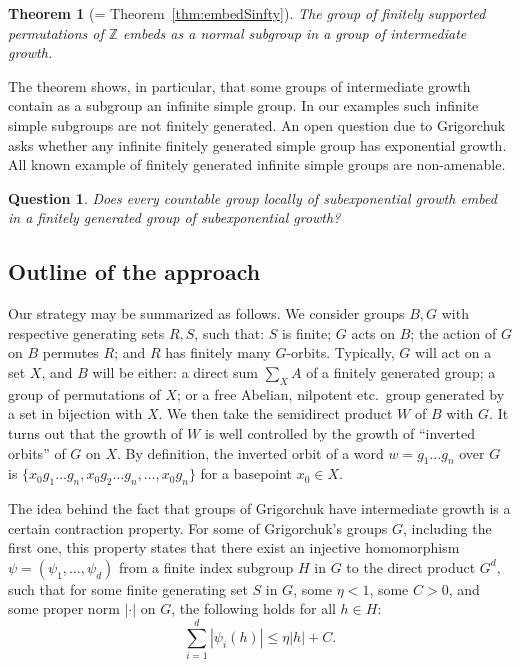 \documentclass{amsart}
\newcommand\Z{\mathbb{Z}}
\newtheorem{maintheorem}{Theorem}
\newtheorem*{mainquestion}{Question}
\theoremstyle{definition}
\begin{document}
\begin{maintheorem}[= Theorem~\ref{thm:embedSinfty}]\label{thm:C}
  The group of finitely supported permutations of $\Z$ embeds as a
  normal subgroup in a group of intermediate growth.
\end{maintheorem}

The theorem shows, in particular, that some groups of intermediate
growth contain as a subgroup an infinite simple group. In our examples
such infinite simple subgroups are not finitely generated. An open
question due to Grigorchuk asks whether any infinite finitely
generated simple group has exponential growth. All known example of
finitely generated infinite simple groups are non-amenable.

\begin{mainquestion}
  Does every countable group locally of subexponential growth embed in
  a finitely generated group of subexponential growth?
\end{mainquestion}

\subsection{Outline of the approach}
Our strategy may be summarized as follows. We consider groups $B,G$
with respective generating sets $R,S$, such that: $S$ is finite; $G$
acts on $B$; the action of $G$ on $B$ permutes $R$; and $R$ has
finitely many $G$-orbits. Typically, $G$ will act on a set $X$, and
$B$ will be either: a direct sum $\sum_XA$ of a finitely generated
group; a group of permutations of $X$; or a free Abelian, nilpotent
etc.\ group generated by a set in bijection with $X$. We then take the
semidirect product $W$ of $B$ with $G$. It turns out that the growth
of $W$ is well controlled by the growth of ``inverted orbits'' of $G$
on $X$. By definition, the inverted orbit of a word $w=g_1\dots g_n$
over $G$ is $\{x_0g_1\dots g_n,x_0g_2\dots g_n,\dots,x_0g_n\}$ for a
basepoint $x_0\in X$.

The idea behind the fact that groups of Grigorchuk have intermediate
growth is a certain contraction property. For some of Grigorchuk's
groups $G$, including the first one, this property states that there
exist an injective homomorphism $\psi=(\psi_1, \dots, \psi_d)$ from a
finite index subgroup $H$ in $G$ to the direct product $G^d$, such
that for some finite generating set $S$ in $G$, some $\eta<1$, some
$C>0$, and some proper norm $|\cdot|$ on $G$, the following holds for
all $h\in H$:
\begin{equation}\label{eq:usualcontraction}
\sum_{i=1}^d |\psi_i(h)| \le \eta|h|+C.
\end{equation}
\end{document}
